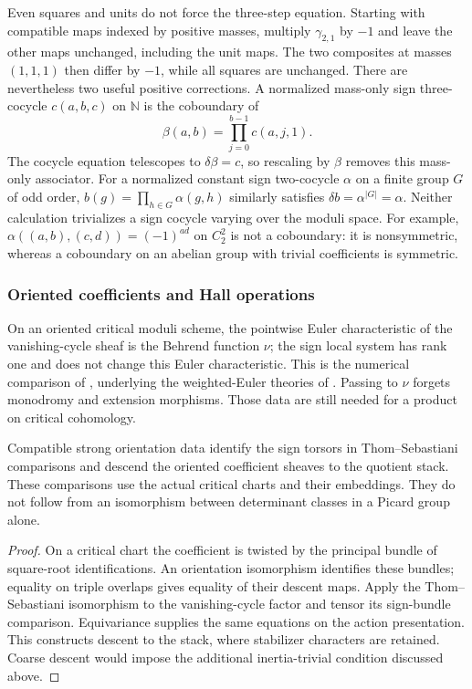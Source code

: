 Even squares and units do not force the three-step equation.  Starting
with compatible maps indexed by positive masses, multiply
\(\gamma_{2,1}\) by \(-1\) and leave the other maps unchanged,
including the unit maps.  The two composites at masses \((1,1,1)\)
then differ by \(-1\), while all squares are unchanged.
There are nevertheless two useful positive corrections.  A normalized
mass-only sign three-cocycle \(c(a,b,c)\) on \(\mathbb N\) is the
coboundary of
\[
 \beta(a,b)=\prod_{j=0}^{b-1}c(a,j,1).
\]
The cocycle equation telescopes to \(\delta\beta=c\), so rescaling
by \(\beta\) removes this mass-only associator.  For a normalized
constant sign two-cocycle \(\alpha\) on a finite group \(G\) of odd order,
\(b(g)=\prod_{h\in G}\alpha(g,h)\) similarly satisfies
\(\delta b=\alpha^{|G|}=\alpha\).  Neither calculation trivializes
a sign cocycle varying over the moduli space.  For example,
\(\alpha((a,b),(c,d))=(-1)^{ad}\) on \(C_2^2\) is not a
coboundary: it is nonsymmetric, whereas a coboundary on an abelian
group with trivial coefficients is symmetric.

\subsubsection*{Oriented coefficients and Hall operations}

On an oriented critical moduli scheme, the pointwise Euler
characteristic of the vanishing-cycle sheaf is the Behrend function
\(\nu\); the sign local system has rank one and does not change this
Euler characteristic.  This is the numerical comparison of
\cite[Remark~6.14]{BBDJS2015}, underlying the weighted-Euler theories
of \cite{BEHREND,JoyceSong}.  Passing to \(\nu\) forgets monodromy
and extension morphisms.  Those data are still needed for a product
on critical cohomology.


\begin{proposition}
\label{prop:orientation-thom-sebastiani-compatibility}
\label{prop:orientation-e-quotient-descent}
Compatible strong orientation data identify the sign torsors in
Thom--Sebastiani comparisons and descend the oriented coefficient
sheaves to the quotient stack.  These comparisons use the actual
critical charts and their embeddings.  They do not follow from an
isomorphism between determinant classes in a Picard group alone.
\end{proposition}
\begin{proof}
On a critical chart the coefficient is twisted by the principal
bundle of square-root identifications.  An orientation isomorphism
identifies these bundles; equality on triple overlaps gives equality
of their descent maps.  Apply the Thom--Sebastiani isomorphism to the
vanishing-cycle factor and tensor its sign-bundle comparison.
Equivariance supplies the same equations on the action presentation.
This constructs descent to the stack, where stabilizer characters
are retained.  Coarse descent would impose the additional
inertia-trivial condition discussed above.
\end{proof}

